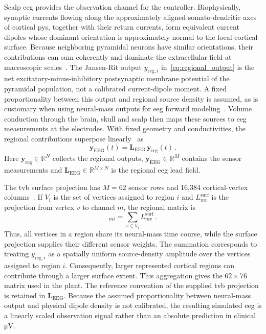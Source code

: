Scalp \ac{eeg} provides the observation channel for the controller.
Biophysically, synaptic currents flowing along the approximately aligned somato-dendritic axes of cortical \acp{py}, together with their return currents, form equivalent current dipoles whose dominant orientation is approximately normal to the local cortical surface.
Because neighboring pyramidal neurons have similar orientations, their contributions can sum coherently and dominate the extracellular field at macroscopic scales~\cite{Buzsaki2012}. %
The Jansen-Rit output $y_{\mathrm{reg},i}$ in~\eqref{eq:regional_output} is the net excitatory-minus-inhibitory postsynaptic membrane potential of the pyramidal population, not a calibrated current-dipole moment.
A fixed proportionality between this output and regional source density is assumed, as is customary when using neural-mass outputs for \ac{eeg} forward modeling~\cite{Jansen1995,David2003}.
Volume conduction through the brain, skull and scalp then maps these sources to \ac{eeg} measurements at the electrodes.
With fixed geometry and conductivities, the regional contributions superpose linearly~\cite{SanzLeon2015} as
%
\begin{equation*}
    \mathbf{y}_\mathrm{EEG}(t)
    =\mathbf{L}_\mathrm{EEG}\,\mathbf{y}_\mathrm{reg}(t)\,.
\end{equation*}
%
Here $\mathbf{y}_\mathrm{reg}\in\mathbb{R}^{N}$ collects the regional outputs, $\mathbf{y}_\mathrm{EEG}\in\mathbb{R}^{M}$ contains the sensor measurements and $\mathbf{L}_\mathrm{EEG}\in\mathbb{R}^{M\times N}$ is the regional \ac{eeg} lead field.

The \ac{tvb} surface projection has $M=62$ sensor rows and 16,384 cortical-vertex columns~\cite{SanzLeon2015}.
If $V_i$ is the set of vertices assigned to region $i$ and $L^{\mathrm{surf}}_{mv}$ is the projection from vertex $v$ to channel $m$, the regional matrix is
%
\begin{equation*}
    [\mathbf{L}_\mathrm{EEG}]_{mi}=\sum_{v\in V_i}L^{\mathrm{surf}}_{mv}\,.
\end{equation*}
%
Thus, all vertices in a region share its neural-mass time course, while the surface projection supplies their different sensor weights.
The summation corresponds to treating $y_{\mathrm{reg},i}$ as a spatially uniform source-density amplitude over the vertices assigned to region $i$. Consequently, larger represented cortical regions can contribute through a larger surface extent.
This aggregation gives the $62\times 76$ matrix used in the plant.
The reference convention of the supplied \ac{tvb} projection is retained in $\mathbf{L}_\mathrm{EEG}$.
Because the assumed proportionality between neural-mass output and physical dipole density is not calibrated, the resulting simulated \ac{eeg} is a linearly scaled observation signal rather than an absolute prediction in clinical \si{\micro\volt}.

